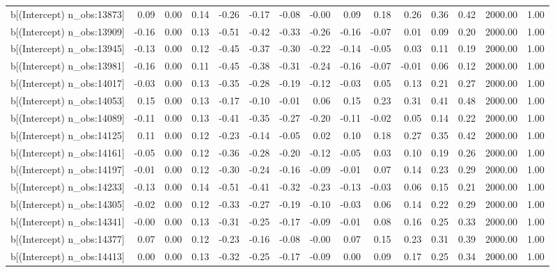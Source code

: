\begin{table}[ht]
\begin{tabular}{rrrrrrrrrrrrrrr}
  b[(Intercept) n\_obs:13873] & 0.09 & 0.00 & 0.14 & -0.26 & -0.17 & -0.08 & -0.00 & 0.09 & 0.18 & 0.26 & 0.36 & 0.42 & 2000.00 & 1.00 \\ 
  b[(Intercept) n\_obs:13909] & -0.16 & 0.00 & 0.13 & -0.51 & -0.42 & -0.33 & -0.26 & -0.16 & -0.07 & 0.01 & 0.09 & 0.20 & 2000.00 & 1.00 \\ 
  b[(Intercept) n\_obs:13945] & -0.13 & 0.00 & 0.12 & -0.45 & -0.37 & -0.30 & -0.22 & -0.14 & -0.05 & 0.03 & 0.11 & 0.19 & 2000.00 & 1.00 \\ 
  b[(Intercept) n\_obs:13981] & -0.16 & 0.00 & 0.11 & -0.45 & -0.38 & -0.31 & -0.24 & -0.16 & -0.07 & -0.01 & 0.06 & 0.12 & 2000.00 & 1.00 \\ 
  b[(Intercept) n\_obs:14017] & -0.03 & 0.00 & 0.13 & -0.35 & -0.28 & -0.19 & -0.12 & -0.03 & 0.05 & 0.13 & 0.21 & 0.27 & 2000.00 & 1.00 \\ 
  b[(Intercept) n\_obs:14053] & 0.15 & 0.00 & 0.13 & -0.17 & -0.10 & -0.01 & 0.06 & 0.15 & 0.23 & 0.31 & 0.41 & 0.48 & 2000.00 & 1.00 \\ 
  b[(Intercept) n\_obs:14089] & -0.11 & 0.00 & 0.13 & -0.41 & -0.35 & -0.27 & -0.20 & -0.11 & -0.02 & 0.05 & 0.14 & 0.22 & 2000.00 & 1.00 \\ 
  b[(Intercept) n\_obs:14125] & 0.11 & 0.00 & 0.12 & -0.23 & -0.14 & -0.05 & 0.02 & 0.10 & 0.18 & 0.27 & 0.35 & 0.42 & 2000.00 & 1.00 \\ 
  b[(Intercept) n\_obs:14161] & -0.05 & 0.00 & 0.12 & -0.36 & -0.28 & -0.20 & -0.12 & -0.05 & 0.03 & 0.10 & 0.19 & 0.26 & 2000.00 & 1.00 \\ 
  b[(Intercept) n\_obs:14197] & -0.01 & 0.00 & 0.12 & -0.30 & -0.24 & -0.16 & -0.09 & -0.01 & 0.07 & 0.14 & 0.23 & 0.29 & 2000.00 & 1.00 \\ 
  b[(Intercept) n\_obs:14233] & -0.13 & 0.00 & 0.14 & -0.51 & -0.41 & -0.32 & -0.23 & -0.13 & -0.03 & 0.06 & 0.15 & 0.21 & 2000.00 & 1.00 \\ 
  b[(Intercept) n\_obs:14305] & -0.02 & 0.00 & 0.12 & -0.33 & -0.27 & -0.19 & -0.10 & -0.03 & 0.06 & 0.14 & 0.22 & 0.29 & 2000.00 & 1.00 \\ 
  b[(Intercept) n\_obs:14341] & -0.00 & 0.00 & 0.13 & -0.31 & -0.25 & -0.17 & -0.09 & -0.01 & 0.08 & 0.16 & 0.25 & 0.33 & 2000.00 & 1.00 \\ 
  b[(Intercept) n\_obs:14377] & 0.07 & 0.00 & 0.12 & -0.23 & -0.16 & -0.08 & -0.00 & 0.07 & 0.15 & 0.23 & 0.31 & 0.39 & 2000.00 & 1.00 \\ 
  b[(Intercept) n\_obs:14413] & 0.00 & 0.00 & 0.13 & -0.32 & -0.25 & -0.17 & -0.09 & 0.00 & 0.09 & 0.17 & 0.25 & 0.34 & 2000.00 & 1.00 \\ 

\end{tabular}
\end{table}
